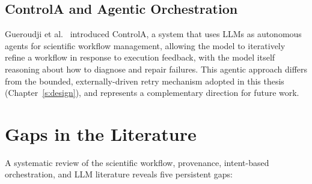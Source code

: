 \subsection{ControlA and Agentic Orchestration}

Gueroudji et al.~\cite{gueroudji2025controla} introduced ControlA, a system that uses LLMs as autonomous
agents for scientific workflow management, allowing the model to iteratively
refine a workflow in response to execution feedback, with the model itself
reasoning about how to diagnose and repair failures. This agentic approach
differs from the bounded, externally-driven retry mechanism adopted in this
thesis (Chapter~\ref{s:design}), and represents a complementary direction for
future work.

\section{Gaps in the Literature}\label{s:gaps}

A systematic review of the scientific workflow, provenance, intent-based
orchestration, and LLM literature reveals five persistent gaps:

